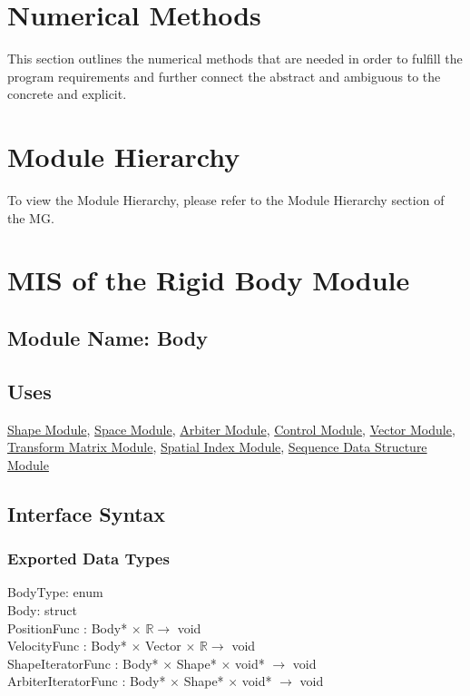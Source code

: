 \documentclass[12pt]{article}
\newcommand{\Shape}{\hyperref[MISShape]{Shape Module}}
\newcommand{\Space}{\hyperref[MISSpace]{Space Module}}
\newcommand{\Arbiter}{\hyperref[MISArbiter]{Arbiter Module}}
\newcommand{\Control}{\hyperref[MISControl]{Control Module}}
\newcommand{\Vector}{\hyperref[MISVector]{Vector Module}}
\newcommand{\Transform}{\hyperref[MISTransform]{Transform Matrix Module}}
\newcommand{\SpatialIndex}{\hyperref[MISSpatial]{Spatial Index Module}}
\newcommand{\Sequence}{\hyperref[MISSequence]{Sequence Data Structure Module}}
\begin{document}
\section{Numerical Methods} \label{SecNumMethods}

This section outlines the numerical methods that
are needed in order to fulfill the program requirements and further
connect the abstract and ambiguous to the concrete and explicit. 

\fi

\section{Module Hierarchy} 

To view the Module Hierarchy, please refer to the Module Hierarchy section of the MG.


\section{MIS of the Rigid Body Module} \label{MISBody}

\subsection{Module Name: Body} 

\subsection{Uses} \label{SecUBody}
	\Shape, \Space, \Arbiter, \Control, \Vector, \Transform, \SpatialIndex, \Sequence
	
\subsection{Interface Syntax}


\subsubsection{Exported Data Types} \label{SecEDTBody}
	BodyType: enum \\
	Body: struct \\
	PositionFunc : Body* $\times$ $\mathbb{R} \to$ void \\
	VelocityFunc : Body* $\times$ Vector $\times$ $\mathbb{R} \to$ void \\
	ShapeIteratorFunc : Body* $\times$ Shape* $\times$ void* $\to$ void \\
	ArbiterIteratorFunc : Body* $\times$ Shape* $\times$ void* $\to$ void 
	
\end{document}
